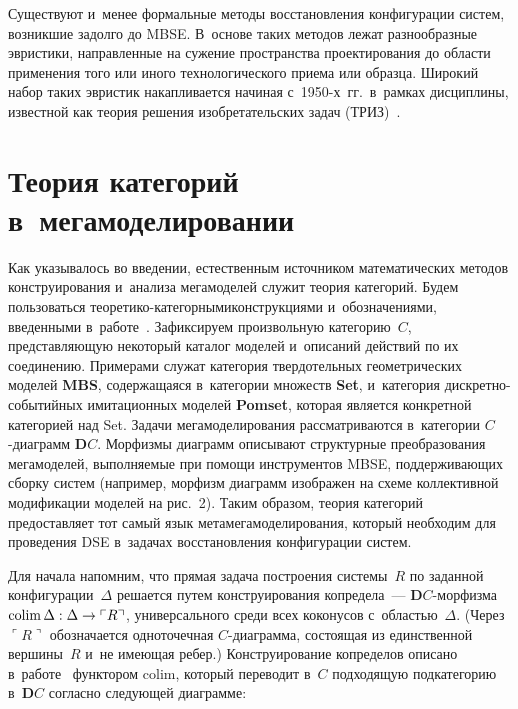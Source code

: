 \begin{multicols}{2}
   Существуют и~менее формальные методы восстановления конфигурации 
сис\-тем, возникшие задолго до MBSE. В~основе таких методов лежат 
разнообразные эвристики, направленные на сужение пространства 
проектирования до области применения того или иного технологического 
приема или образца. Широкий набор таких эвристик накапливается начиная 
с~1950-х~гг.\ в~рамках дисциплины, известной как теория решения 
изобретательских задач (ТРИЗ)~\cite{13-kov}.

\section{Теория категорий в~мегамоделировании}

   Как указывалось во введении, естественным\linebreak
    источником математических 
методов конструирования и~анализа мегамоделей служит теория кате\-горий. 
Будем пользоваться тео\-ре\-ти\-ко-ка\-те\-гор\-ны\-ми\linebreak конструкциями 
и~обозначениями, введенными в~работе~\cite{4-kov}. Зафиксируем 
произвольную категорию~$C$, представляющую некоторый каталог моделей 
и~описаний действий по их соединению. Примерами служат категория 
твердотельных геометрических моделей \textbf{MBS}, содержащаяся в~категории 
множеств \textbf{Set}, и~категория дис\-крет\-но-со\-бы\-тий\-ных имитационных 
моделей \textbf{Pomset}, которая является конкретной категорией над Set. Задачи 
мегамоделирования рассматриваются в~категории $C$-диа\-грамм 
$\mathbf{D}C$. Морфизмы диаграмм описывают структурные преобразования 
мегамоделей, выполняемые при помощи инструментов MBSE, 
поддерживающих сборку сис\-тем (например, морфизм диаграмм изображен на 
схеме коллективной модификации моделей на рис.~2). Таким образом, теория 
категорий предоставляет тот самый язык метамегамоделирования, который 
необходим для проведения DSE в~задачах восстановления конфигурации 
сис\-тем.
   
   Для начала напомним, что прямая задача построения сис\-те\-мы~$R$ по 
заданной конфигурации~$\Delta$ решается путем конструирования  
копредела~---\linebreak
 $\mathbf{D}C$-мор\-физ\-ма ${\mathrm{colim}}\,\Delta : \Delta \hm\to 
\ulcorner R\urcorner$, универсального среди всех коконусов 
с~областью~$\Delta$. (Через $\ulcorner R\urcorner$ обозначается одноточечная 
$C$-диа\-грам\-ма, состоящая из единственной вершины~$R$ и~не имеющая 
ребер.) Конструирование копределов описано в~работе~\cite{4-kov} функтором 
$\mathrm{colim}$, который переводит в~$C$ подходящую подкатегорию 
в~$\mathbf{D}C$ согласно сле\-ду\-ющей диаграмме:


\end{multicols}
